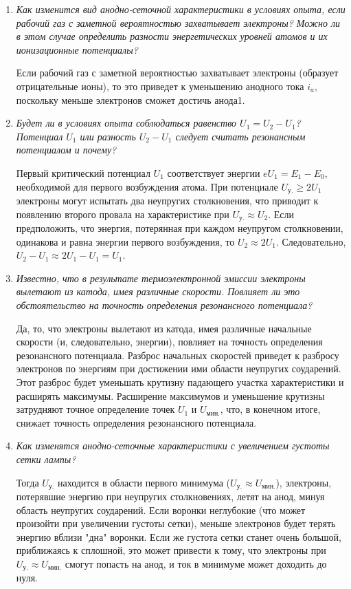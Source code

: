 \documentclass[a4paper]{article}
\begin{document}
\begin{enumerate}
    \item {\it Как изменится вид анодно-сеточной характеристики в условиях опыта,
    если рабочий газ с заметной вероятностью захватывает электроны?
    Можно ли в этом случае определить разности энергетических уровней атомов и их ионизационные потенциалы?}

    Если рабочий газ с заметной вероятностью захватывает электроны
    (образует отрицательные ионы),
    то это приведет к уменьшению анодного тока $i_a$,
    поскольку меньше электронов сможет достичь анода1.

    \item {\it Будет ли в условиях опыта соблюдаться равенство $U_1 = U_2 - U_1$?
    Потенциал $U_1$ или разность $U_2 - U_1$ следует считать резонансным потенциалом и почему?}

    Первый критический потенциал $U_1$ соответствует энергии $eU_1 = E_1 - E_0$,
    необходимой для первого возбуждения атома.
    При потенциале $U_\text{у.} \geqslant 2U_1$ электроны могут испытать два неупругих столкновения,
    что приводит к появлению второго провала на характеристике при $U_\text{у.} \approx U_2$.
    Если предположить, что энергия, потерянная при каждом неупругом столкновении,
    одинакова и равна энергии первого возбуждения, то $U_2 \approx 2U_1$.
    Следовательно, $U_2 - U_1 \approx 2U_1 - U_1 = U_1$.

    \item {\it Известно, что в результате термоэлектронной эмиссии электроны вылетают из катода,
    имея различные скорости. Повлияет ли это обстоятельство на точность определения резонансного потенциала?}

    Да, то, что электроны вылетают из катода, имея различные начальные скорости
    (и, следовательно, энергии), повлияет на точность определения резонансного потенциала.
    Разброс начальных скоростей приведет к разбросу электронов по энергиям при достижении ими области неупругих соударений.
    Этот разброс будет уменьшать крутизну падающего участка характеристики и расширять максимумы.
    Расширение максимумов и уменьшение крутизны затрудняют точное определение точек $U_1$ и $U_\text{мин.}$,
    что, в конечном итоге, снижает точность определения резонансного потенциала.

    \item {\it Как изменятся анодно-сеточные характеристики с увеличением густоты сетки лампы?}
    
    Тогда $U_\text{у.}$ находится в области первого минимума ($U_\text{у.} \approx U_\text{мин.}$),
    электроны, потерявшие энергию при неупругих столкновениях, летят на анод,
    минуя область неупругих соударений.
    Если воронки неглубокие (что может произойти при увеличении густоты сетки),
    меньше электронов будет терять энергию вблизи "дна" воронки.
    Если же густота сетки станет очень большой, приближаясь к сплошной,
    это может привести к тому, что электроны при $U_\text{у.} \approx U_\text{мин.}$
    смогут попасть на анод, и ток в минимуме может доходить до нуля.


\end{enumerate}
\end{document}
